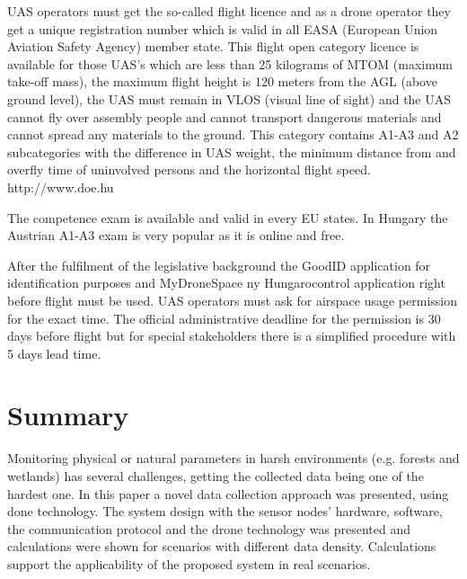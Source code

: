 \documentclass[conference]{IEEEtran}
\begin{document}
UAS operators must get the so-called flight licence and as a drone operator
they get a unique registration number which is valid in all EASA (European
Union Aviation Safety Agency) member state. This flight open category licence
is available for those UAS’s which are less than 25 kilograms of MTOM (maximum
take-off mass), the maximum flight height is 120 meters from the AGL (above
ground level), the UAS must remain in VLOS (visual line of sight) and the UAS
cannot fly over assembly people and cannot transport dangerous materials and
cannot spread any materials to the ground. This category contains A1-A3 and A2
subcategories with the difference in UAS weight, the minimum distance from and
overfly time of uninvolved persons and the horizontal flight speed.
http://www.doe.hu

The competence exam is available and valid in every EU states. In Hungary the
Austrian A1-A3 exam is very popular as it is online and free.

After the fulfilment of the legislative background the GoodID application for
identification purposes and MyDroneSpace ny Hungarocontrol application right
before flight must be used. UAS operators must ask for airspace usage
permission for the exact time. The official administrative deadline for the
permission is 30 days before flight but for special stakeholders there is a
simplified procedure with 5 days lead time.

\section{Summary}

Monitoring physical or natural parameters in harsh environments (e.g. forests and wetlands) has several
challenges, getting the collected data being one of the hardest one. In this paper a novel data
collection approach was presented, using done technology.
The system design with the sensor nodes' hardware, software,
the communication protocol and the drone technology was presented and
calculations were shown for scenarios with different data density.
Calculations support the applicability of the proposed system
in real scenarios.



\end{document}
